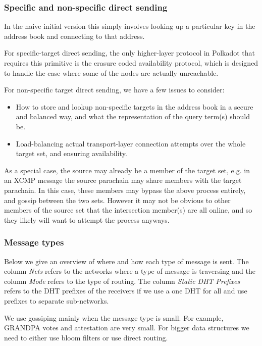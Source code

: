 \subsubsection{Specific and non-specific direct sending}

In the naive initial version this simply involves looking up a particular key in the address book and connecting to that address.

For specific-target direct sending, the only higher-layer protocol in Polkadot that requires this primitive is the erasure coded availability protocol, which is designed to handle the case where some of the nodes are actually unreachable.

For non-specific target direct sending, we have a few issues to consider:

\begin{itemize}
\item How to store and lookup non-specific targets in the address book in a secure and balanced way, and what the representation of the query term(s) should be.
\item Load-balancing actual transport-layer connection attempts over the whole target set, and ensuring availability.
\end{itemize}

As a special case, the source may already be a member of the target set, e.g. in an XCMP message the source parachain may share members with the target parachain. In this case, these members may bypass the above process entirely, and gossip between the two sets. However it may not be obvious to other members of the source set that the intersection member(s) are all online, and so they likely will want to attempt the process anyways.

\subsubsection{Message types}
Below we give an overview of where and how each type of message is sent. The column \emph{Nets} refers to the networks where a type of message is traversing and the column \emph{Mode} refers to the type of  routing. The column \emph{Static DHT Prefixes} refers to the DHT prefixes of the receivers if we use a one DHT for all and use prefixes to separate sub-networks.

We use gossiping mainly when the message type is small. For example, GRANDPA votes and attestation are very small. For bigger data structures we need to either use bloom filters or use direct routing.


